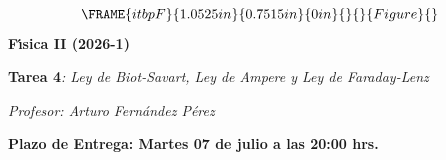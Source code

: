 \documentclass[onecolumn]{article}
\begin{document}
\begin{center}
\begin{equation*}
\FRAME{itbpF}{1.0525in}{0.7515in}{0in}{}{}{Figure}{\special{language
"Scientific Word";type "GRAPHIC";maintain-aspect-ratio TRUE;display
"USEDEF";valid_file "T";width 1.0525in;height 0.7515in;depth
0in;original-width 2.3168in;original-height 1.6466in;cropleft "0";croptop
"1";cropright "1";cropbottom "0";tempfilename
'TCTQIQ04.bmp';tempfile-properties "XPR";}}
\end{equation*}%
\textbf{F\'{\i}sica II (2026-1)}

\textbf{Tarea 4}\emph{: Ley de Biot-Savart, Ley de Ampere y Ley de
Faraday-Lenz}

\textit{Profesor: Arturo Fern\'{a}ndez P\'{e}rez}

\textbf{Plazo de Entrega: Martes 07 de julio a las 20:00 hrs.}
\end{center}
\end{document}
